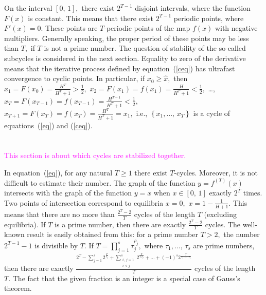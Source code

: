 \documentclass[12pt,a4paper]{amsart}
\begin{document}
On the interval $[0,\,1],$ there exist $2^{T-1}$ disjoint intervals, where the function $F(x)$ is constant. This means that there exist $2^{T-1}$ 
periodic points, where $F'(x)=0.$ These points are $T$-periodic points of the map $f(x)$ with negative multipliers. Generally speaking, 
the proper period of these points may be less than $T,$ if $T$ is not a prime number. The question of stability of the so-called subcycles 
is considered in the next section. Equality to zero of the derivative means that the iterative process defined by equation~(\ref{ceq}) has 
ultrafast convergence to cyclic points. In particular, if $x_0 \geq \hat{x},$ then $x_1 = F(x_0) = \frac{H^T}{H^T + 1} > \frac12,$
$x_2 = F(x_1) = f(x_1) = \frac{H}{H^T + 1} < \frac12,$ \ldots , $x_T = F(x_{T-1}) = f(x_{T-1}) = \frac{H^{T-1}}{H^T + 1} < \frac12,$
$x_{T+1} = F(x_T) = f(x_T) = \frac{H^T}{H^T + 1} = x_1,$ i.e., $\left\{ x_1,\ldots,\,x_T\right\}$ is a cycle of equations~(\ref{eq}) and 
(\ref{ceq}). 

\section{}

\textcolor{magenta}{This section is about which cycles are stabilized together.}

In equation~(\ref{eq}), for any natural $T \geq 1$ there exist $T$-cycles. Moreover, it is not difficult to estimate their number. The graph of the function 
$y = f^{(T)}(x)$ intersects with the graph of the function $y = x$ when $x\in[0,\,1]$ exactly $2^T$ times. Two points of intersection correspond to 
equilibria $x=0,$ $x = 1 - \frac{1}{H+1}$. This means that there are no more than $\frac{2^T - 2}{T}$ cycles of the length $T$ (excluding equilibria). 
If $T$ is a prime number, then there are exactly $\frac{2^T - 2}{T}$ cycles. The well-known result is easily obtained from this: for a prime number $T>2,$ 
the number $2^{T-1} - 1$ is divisible by $T.$ If $T = \prod\limits_{j=1}^{s} {\tau_{j}^{\rho_j}},$ where $\tau_1,\ldots,\,\tau_s$ are prime numbers, 
then there are exactly $\frac{2^T - \sum\limits_{j=1}^{s}{2^\frac{T}{\tau_j}} + \sum\limits_{\substack{i,\,j=1 \\ i<j}}^{s}{2^\frac{T}{\tau_i \tau_j}} + \ldots +
(-1)^s 2^\frac{T}{\tau_1 \cdot \ldots \cdot \tau_s}}{T}$ cycles of the length $T.$ The fact that the given fraction is an integer is a special case of 
Gauss's theorem.
\end{document}
